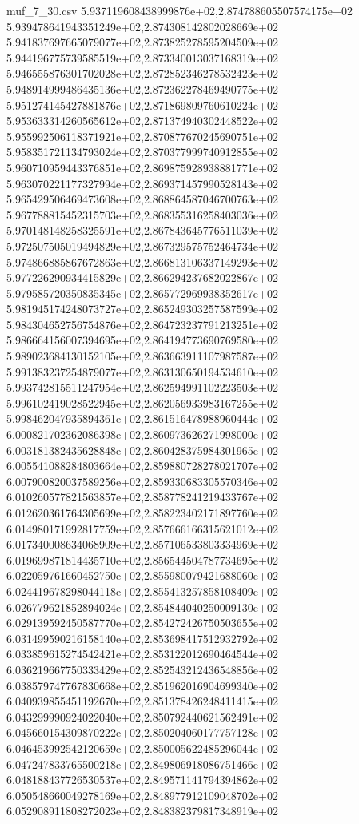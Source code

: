 \begin{filecontents*}{muf_7_30.csv}
5.937119608438999876e+02,2.874788605507574175e+02
5.939478641943351249e+02,2.874308142802028669e+02
5.941837697665079077e+02,2.873825278595204509e+02
5.944196775739585519e+02,2.873340013037168319e+02
5.946555876301702028e+02,2.872852346278532423e+02
5.948914999486435136e+02,2.872362278469490775e+02
5.951274145427881876e+02,2.871869809760610224e+02
5.953633314260565612e+02,2.871374940302448522e+02
5.955992506118371921e+02,2.870877670245690751e+02
5.958351721134793024e+02,2.870377999740912855e+02
5.960710959443376851e+02,2.869875928938881771e+02
5.963070221177327994e+02,2.869371457990528143e+02
5.965429506469473608e+02,2.868864587046700763e+02
5.967788815452315703e+02,2.868355316258403036e+02
5.970148148258325591e+02,2.867843645776511039e+02
5.972507505019494829e+02,2.867329575752464734e+02
5.974866885867672863e+02,2.866813106337149293e+02
5.977226290934415829e+02,2.866294237682022867e+02
5.979585720350835345e+02,2.865772969938352617e+02
5.981945174248073727e+02,2.865249303257587599e+02
5.984304652756754876e+02,2.864723237791213251e+02
5.986664156007394695e+02,2.864194773690769580e+02
5.989023684130152105e+02,2.863663911107987587e+02
5.991383237254879077e+02,2.863130650194534610e+02
5.993742815511247954e+02,2.862594991102223503e+02
5.996102419028522945e+02,2.862056933983167255e+02
5.998462047935894361e+02,2.861516478988960444e+02
6.000821702362086398e+02,2.860973626271998000e+02
6.003181382435628848e+02,2.860428375984301965e+02
6.005541088284803664e+02,2.859880728278021707e+02
6.007900820037589256e+02,2.859330683305570346e+02
6.010260577821563857e+02,2.858778241219433767e+02
6.012620361764305699e+02,2.858223402171897760e+02
6.014980171992817759e+02,2.857666166315621012e+02
6.017340008634068909e+02,2.857106533803334969e+02
6.019699871814435710e+02,2.856544504787734695e+02
6.022059761660452750e+02,2.855980079421688060e+02
6.024419678298044118e+02,2.855413257858108409e+02
6.026779621852894024e+02,2.854844040250009130e+02
6.029139592450587770e+02,2.854272426750503655e+02
6.031499590216158140e+02,2.853698417512932792e+02
6.033859615274542421e+02,2.853122012690464544e+02
6.036219667750333429e+02,2.852543212436548856e+02
6.038579747767830668e+02,2.851962016904699340e+02
6.040939855451192670e+02,2.851378426248411415e+02
6.043299990924022040e+02,2.850792440621562491e+02
6.045660154309870222e+02,2.850204060177757128e+02
6.046453992542120659e+02,2.850005622485296044e+02
6.047247833765500218e+02,2.849806918086751466e+02
6.048188437726530537e+02,2.849571141794394862e+02
6.050548660049278169e+02,2.848977912109048702e+02
6.052908911808272023e+02,2.848382379817348919e+02

\end{filecontents*}
